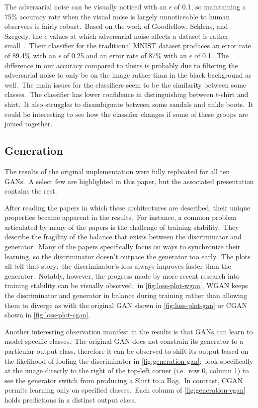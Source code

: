 \documentclass[conference]{IEEEtran}
\begin{document}
    The adversarial noise can be visually noticed with an \(\epsilon\) of 0.1, so maintaining a 75\% accuracy rate when the visual noise is largely unnoticeable to human observers is fairly robust.\ Based on the work of Goodfellow, Schlens, and Szegedy, the \(\epsilon\) values at which adversarial noise affects a dataset is rather small~\cite{adversarialexamples}.\ Their classifier for the traditional MNIST dataset produces an error rate of 89.4\% with an \(\epsilon\) of 0.25 and an error rate of 87\% with an \(\epsilon\) of 0.1.\ The difference in our accuracy compared to theirs is probably due to filtering the adversarial noise to only be on the image rather than in the black background as well.\ The main issues for the classifiers seem to be the similarity between some classes.\ The classifier has lower confidence in distinguishing between t-shirt and shirt.\ It also struggles to disambiguate between some sandals and ankle boots.\ It could be interesting to see how the classifier changes if some of these groups are joined together.

    \subsection{Generation}\label{subsec:results-generation}

    The results of the original implementation were fully replicated for all ten GANs.\ A select few are highlighted in this paper, but the associated presentation contains the rest.

    After reading the papers in which these architectures are described, their unique properties became apparent in the results.\ For instance, a common problem articulated by many of the papers is the challenge of training stability.\ They describe the fragility of the balance that exists between the discriminator and generator.\ Many of the papers specifically focus on ways to synchronize their learning, so the discriminator doesn't outpace the generator too early.\ The plots all tell that story;\ the discriminator's loss always improves faster than the generator.\ Notably, however, the progress made by more recent research into training stability can be visually observed;\ in \autoref{fig:loss-plot-wgan}, WGAN keeps the discriminator and generator in balance during training rather than allowing them to diverge as with the original GAN shown in \autoref{fig:loss-plot-gan} or CGAN shown in \autoref{fig:loss-plot-cgan}.

    Another interesting observation manifest in the results is that GANs can learn to model specific classes.\ The original GAN does not constrain its generator to a particular output class, therefore it can be observed to shift its output based on the likelihood of fooling the discriminator in \autoref{fig:generation-gan};\ look specifically at the image directly to the right of the top-left corner (i.e.\ row 0, column 1) to see the generator switch from producing a Shirt to a Bag.\ In contrast, CGAN permits learning only on specified classes.\ Each column of \autoref{fig:generation-cgan} holds predictions in a distinct output class.
\end{document}

